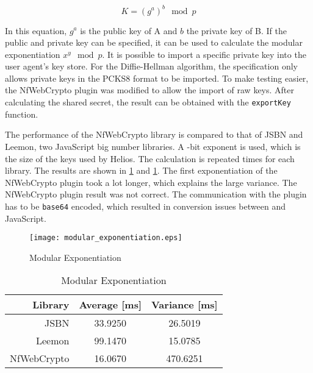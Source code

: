 \begin{equation}
  \label{eq:wc:diffie_hellman}
  K = (g^a)^b \mod{p}
\end{equation}

\par In this equation, $g^a$ is the public key of A and $b$ the private key of B. If the public and private key can be specified, it can be used to calculate the modular exponentiation $x^y \mod{p}$. It is possible to import a specific private key into the user agent's key store. For the Diffie-Hellman algorithm, the specification only allows private keys in the PCKS8 format to be imported. To make testing easier, the NfWebCrypto plugin was modified to allow the import of raw keys. After calculating the shared secret, the result can be obtained with the \texttt{exportKey} function.

\par The performance of the NfWebCrypto library is compared to that of JSBN and Leemon, two JavaScript big number libraries.\cite{site:wu_rsa_and_ecc_in_javascript}\cite{site:baird_big_integers_in_javascript} A -bit exponent is used, which is the size of the keys used by Helios. The calculation is repeated  times for each library. The results are shown in \ref{fig:wc:modular_exponentiation} and \ref{tab:wc:modular_exponentiation}. The first exponentiation of the NfWebCrypto plugin took a lot longer, which explains the large variance. The NfWebCrypto plugin result was not correct. The communication with the plugin has to be \texttt{base64} encoded, which resulted in conversion issues between \cplusplus and JavaScript.

\begin{figure}
  \centering
  \texttt{[image: modular\_exponentiation.eps]}
  \caption{Modular Exponentiation}
  \label{fig:wc:modular_exponentiation}
\end{figure}

\begin{table}
  \centering
  \caption{Modular Exponentiation}
  \label{tab:wc:modular_exponentiation}
  \begin{tabular}{r | c c}
    Library & Average [ms] & Variance [ms] \\ \hline
    JSBN & 33.9250 & 26.5019  \\
    Leemon & 99.1470 & 15.0785 \\
    NfWebCrypto & 16.0670 & 470.6251
  \end{tabular}
\end{table}


